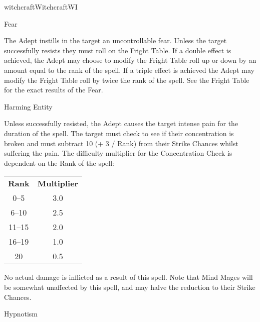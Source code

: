 \begin{college}[1.1]{witchcraft}{Witchcraft}{WI}
\begin{spell}[G-4]{Fear}
\begin{effects}
The Adept instills in the target an uncontrollable fear.  Unless the
target successfully resists they must roll on the Fright Table.  If a
double effect is achieved, the Adept may choose to modify the Fright
Table roll up or down by an amount equal to the rank of the spell.  If
a triple effect is achieved the Adept may modify the Fright Table roll
by twice the rank of the spell.  See the Fright Table for the exact
results of the Fear.
\end{effects}
\end{spell}

\begin{spell}[G-5]{Harming Entity}

\begin{effects}
Unless successfully resisted, the Adept causes the target intense
pain for the duration of the spell.  The target must check to see if
their concentration is broken and must subtract 10 (+ 3 / Rank) from
their Strike Chances whilst suffering the pain.  The difficulty
multiplier for the Concentration Check is dependent on the Rank of the
spell:

\begin{tabular}{cc}
\textbf{Rank}  & \textbf{Multiplier} \\
0--5	& 3.0 \\
6--10	& 2.5 \\
11--15	& 2.0 \\
16--19	& 1.0 \\
20	& 0.5 \\
\end{tabular}

No actual damage is inflicted as a result of this spell.  Note that
Mind Mages will be somewhat unaffected by this spell, and may halve
the reduction to their Strike Chances.
\end{effects}
\end{spell}

\begin{spell}[G-6]{Hypnotism}


\end{spell}
\end{college}
